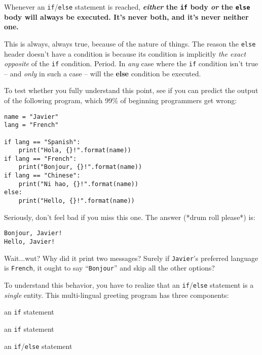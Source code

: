 \label{cardinalRule}

\begin{shaded}
Whenever an \texttt{if}/\texttt{else} statement is reached,
\textbf{\textit{either} the \texttt{if} body \textit{or} the \texttt{else}
body will always be executed. It's never both, and it's never neither one.}
\end{shaded}

This is always, always true, because of the nature of things. The reason the
\texttt{else} header doesn't have a condition is because its condition is
implicitly \textit{the exact opposite} of the \texttt{if} condition. Period. In
\textit{any} case where the \texttt{if} condition isn't true -- and
\textit{only} in such a case -- will the \textbf{else} condition be executed.

To test whether you fully understand this point, see if you can predict the
output of the following program, which 99\% of beginning programmers get wrong:

\label{spanishFrenchPitfall}

\begin{Verbatim}[fontsize=\small,samepage=true,frame=single,framesep=3mm]
name = "Javier"
lang = "French"

if lang == "Spanish":
    print("Hola, {}!".format(name))
if lang == "French":
    print("Bonjour, {}!".format(name))
if lang == "Chinese":
    print("Ni hao, {}!".format(name))
else:
    print("Hello, {}!".format(name))
\end{Verbatim}
\vspace{-.2in}

Seriously, don't feel bad if you miss this one. The answer (*drum roll please*)
is:

\begin{Verbatim}[fontsize=\small,samepage=true,frame=leftline,framesep=5mm,framerule=1mm]
Bonjour, Javier!
Hello, Javier!
\end{Verbatim}

Wait...wut? Why did it print two messages? Surely if \texttt{Javier}'s
preferred language is \texttt{French}, it ought to say ``\texttt{Bonjour}'' and
skip all the other options?

To understand this behavior, you have to realize that an
\texttt{if}/\texttt{else} statement is a \textit{single} entity. This
multi-lingual greeting program has three components:

\begin{samepage}
\begin{compactenum}
\item an \texttt{if} statement
\item an \texttt{if} statement
\item an \texttt{if}/\texttt{else} statement
\end{compactenum}
\end{samepage}

